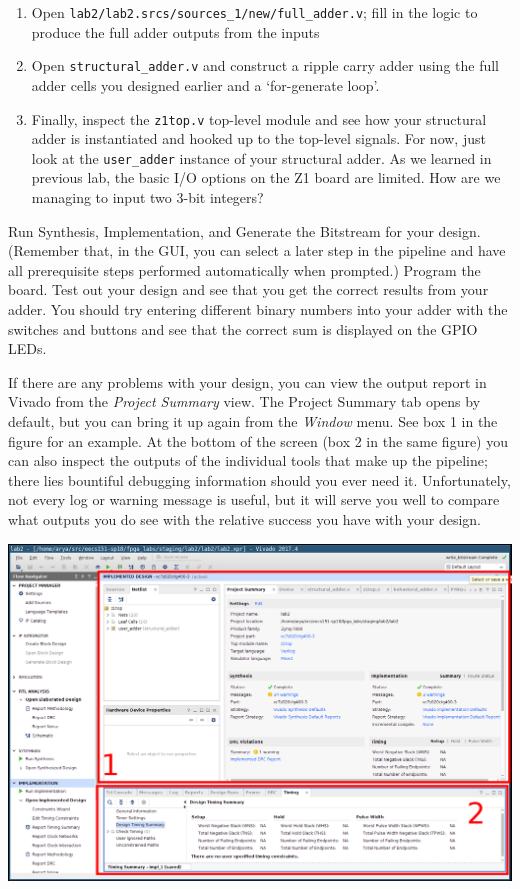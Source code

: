 \documentclass[11pt]{article}
\begin{document}
\begin{enumerate}
  \item Open \verb|lab2/lab2.srcs/sources_1/new/full_adder.v|; fill in the logic to produce the full adder outputs from the inputs
  \item Open \verb|structural_adder.v| and construct a ripple carry adder using the full adder cells you designed earlier and a `for-generate loop'.
  \item Finally, inspect the \verb|z1top.v| top-level module and see how your structural adder is instantiated and hooked up to the top-level signals. For now, just look at the \verb|user_adder| instance of your structural adder. As we learned in previous lab, the basic I/O options on the Z1 board are limited. How are we managing to input two 3-bit integers?
\end{enumerate}

Run Synthesis, Implementation, and Generate the Bitstream for your design. (Remember that, in the GUI, you can select a later step in the pipeline and have all prerequisite steps performed automatically when prompted.) Program the board. Test out your design and see that you get the correct results from your adder. You should try entering different binary numbers into your adder with the switches and buttons and see that the correct sum is displayed on the GPIO LEDs.

If there are any problems with your design, you can view the output report in Vivado from the \emph{Project Summary} view. The Project Summary tab opens by default, but you can bring it up again from the \emph{Window} menu. See box 1 in the figure for an example. At the bottom of the screen (box 2 in the same figure) you can also inspect the outputs of the individual tools that make up the pipeline; there lies bountiful debugging information should you ever need it. Unfortunately, not every log or warning message is useful, but it will serve you well to compare what outputs you do see with the relative success you have with your design.

\begin{center}
  \includegraphics[width=\textwidth]{figs/vivado_project_summary.png}
\end{center}
\end{document}
